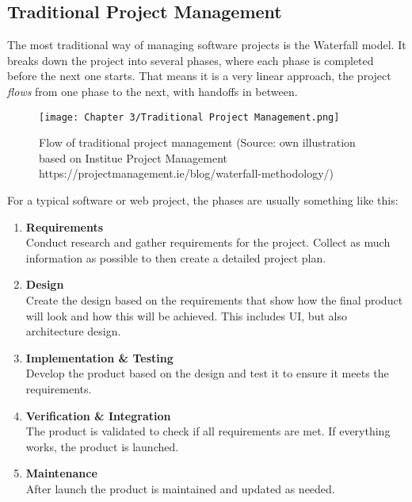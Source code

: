 \newpage
\subsection{Traditional Project Management}
The most traditional way of managing software projects is the Waterfall model. It breaks down the
project into several phases, where each phase is completed before the next one starts. That means
it is a very linear approach, the project \textit{flows} from one phase to the next, with handoffs in
between. 

\begin{figure}[H]
      \centering
      \texttt{[image: Chapter 3/Traditional Project Management.png]}
      \caption{Flow of traditional project management (Source: own illustration based on Institue Project Management https://projectmanagement.ie/blog/waterfall-methodology/)}
\end{figure}
For a typical software or web project, the phases are usually something like this: %
\begin{enumerate}
      \item \textbf{Requirements}\\
            Conduct research and gather requirements for the project. Collect as much information
            as possible to then create a detailed project plan.
      \item \textbf{Design}\\
            Create the design based on the requirements that show how the final product will look
            and how this will be achieved. This includes UI, but also architecture design.
      \item \textbf{Implementation \& Testing}\\
            Develop the product based on the design and test it to ensure it meets the
            requirements.
      \item \textbf{Verification \& Integration}\\
            The product is validated to check if all requirements are met. If everything works,
            the product is launched.
      \item \textbf{Maintenance}\\
            After launch the product is maintained and updated as needed.
\end{enumerate}

